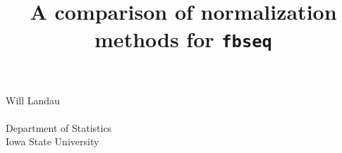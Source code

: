 \documentclass{article}
\begin{document}
\begin{titlepage}
\title{A comparison of normalization methods for {\tt fbseq}}
\maketitle

\begin{center}
\vspace{1cm}
\Large
\begin{center}
Will Landau \\ $\quad$ \\
Department of Statistics \\
Iowa State University \\ $\quad$ \\
\end{center}

\vfill
\end{center}
\end{titlepage}
\end{document}

